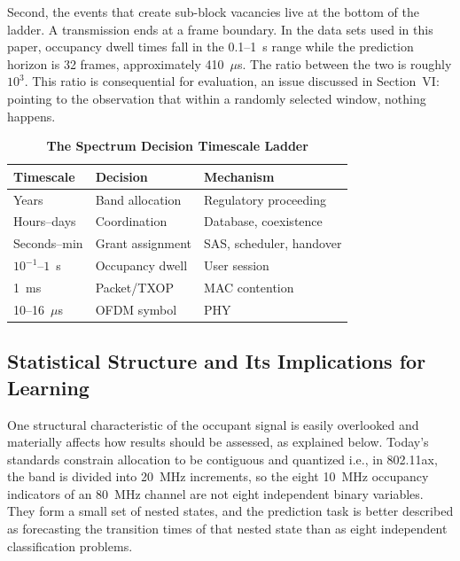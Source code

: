 \documentclass[lettersize,journal]{IEEEtran}
\newcommand{\us}{\ensuremath{\mu}s}
\begin{document}
Second, the events that create sub-block vacancies live at the bottom of
the ladder.
A transmission ends at a frame boundary.
In the data sets used in this paper, occupancy dwell times fall in
the 0.1--1~s range while the prediction horizon is 32 frames,
approximately 410~\us.
The ratio between the two is roughly $10^{3}$.
This ratio is consequential for evaluation, an issue discussed in
Section~VI: pointing to the observation that within a randomly selected
window, nothing happens.

\begin{table}[!t]
\centering
\caption{\textbf{The Spectrum Decision Timescale Ladder}}
\label{tab:timescales}
\renewcommand{\arraystretch}{1.2}
\begin{tabular}{@{}lll@{}}
\toprule
\textbf{Timescale} & \textbf{Decision} & \textbf{Mechanism} \\
\midrule
Years            & Band allocation        & Regulatory proceeding \\
Hours--days      & Coordination           & Database, coexistence \\
Seconds--min     & Grant assignment       & SAS, scheduler, handover \\
$10^{-1}$--$1$~s & Occupancy dwell        & User session \\
1~ms             & Packet/TXOP            & MAC contention \\
10--16~$\mu$s    & OFDM symbol            & PHY \\
\bottomrule
\end{tabular}
\end{table}

\subsection{\textbf{Statistical Structure and Its Implications for Learning}}
\label{sec:nested}
One structural characteristic of the occupant signal is easily overlooked and
materially affects how results should be assessed, as explained below.
Today's standards constrain allocation to be contiguous and quantized 
i.e., in 802.11ax, the band is divided into 20~MHz increments, 
so the eight 10~MHz occupancy indicators of an 80~MHz 
channel are not eight independent binary variables.
They form a small set of nested states, and the prediction task is better
described as forecasting the transition times of that nested state than as eight
independent classification problems.
\end{document}
